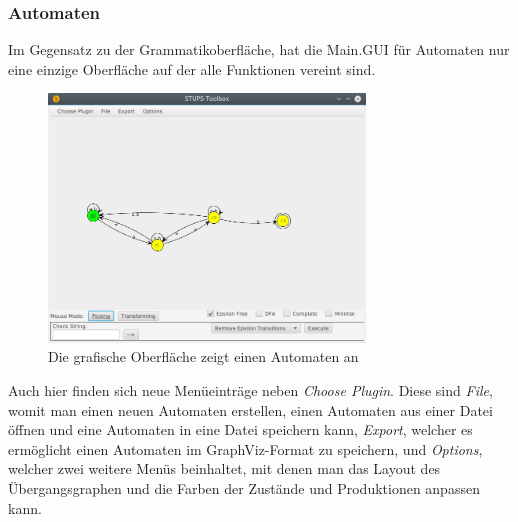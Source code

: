 \subsubsection{Automaten}
\label{sec:2.4.2}
Im Gegensatz zu der Grammatikoberfläche, hat die Main.GUI für Automaten nur eine einzige Oberfläche auf der alle Funktionen vereint sind.
\begin{figure}[H]
	\centering
	\includegraphics[width=0.75\textwidth]{bilder/gui2.png}
	\caption{Die grafische Oberfläche zeigt einen Automaten an}
	\label{fig:pic5}
\end{figure}
Auch hier finden sich neue Menüeinträge neben \textit{Choose Plugin}. Diese sind \textit{File}, womit man einen neuen Automaten erstellen, einen Automaten aus einer Datei öffnen und eine Automaten in eine Datei speichern kann, \textit{Export}, welcher es ermöglicht einen Automaten im GraphViz-Format zu speichern, und \textit{Options}, welcher zwei weitere Menüs beinhaltet, mit denen man das Layout des Übergangsgraphen und die Farben der Zustände und Produktionen anpassen kann.\\
